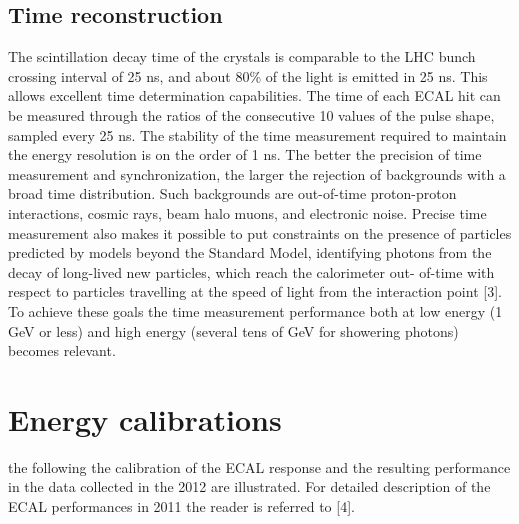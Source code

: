 \documentclass[journal]{IEEEtran}
\begin{document}
\subsection{Time reconstruction}
The scintillation decay time of the crystals is comparable to the LHC bunch crossing interval of 25 ns, and about 80\% of the light is emitted in 25 ns. This allows excellent time determination capabilities. The time of each ECAL hit can be measured through the ratios of the consecutive 10 values of the pulse shape, sampled every 25 ns.  The stability of the time measurement required to maintain the energy resolution is on the order of 1 ns. The better the precision of time measurement and synchronization, the larger the rejection of backgrounds with
a broad time distribution. Such backgrounds are out-of-time proton-proton interactions, cosmic rays, beam halo muons, and electronic noise. Precise time measurement also makes it possible to put constraints on the presence of particles predicted by models beyond the Standard Model, identifying photons from the decay of long-lived new particles, which reach the calorimeter out- of-time with respect to particles travelling at the speed of light from the interaction point [3]. To achieve these goals the time measurement performance both at low energy (1 GeV or less) and high energy (several tens of GeV for showering photons) becomes relevant.

\section{Energy calibrations}
 the following the calibration of the ECAL response and the resulting performance in the data collected in the 2012 are illustrated. For detailed description of the ECAL performances in 2011 the reader is referred to [4].
\end{document}
